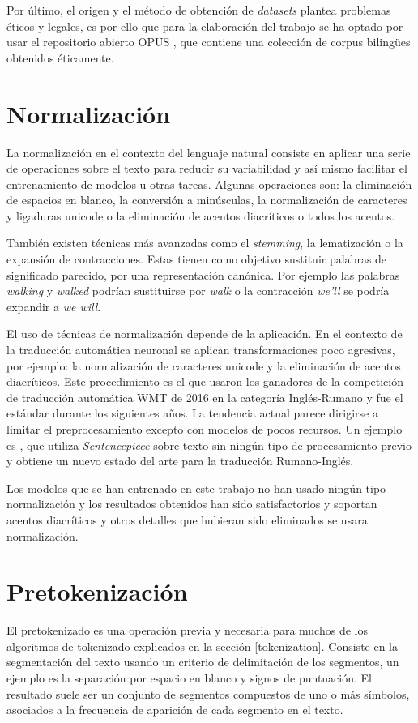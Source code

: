Por último, el origen y el método de obtención de \textit{datasets} plantea problemas éticos y legales, es por ello que para la elaboración del trabajo se ha optado por usar el repositorio abierto OPUS \cite{CORPUS}, que contiene una colección de corpus biling{\"u}es obtenidos éticamente.

\section{Normalización}\label{datanorm}
La normalización en el contexto del lenguaje natural consiste en aplicar una serie de operaciones sobre el texto para reducir su variabilidad y así mismo facilitar el entrenamiento de modelos u otras tareas. Algunas operaciones son: la eliminación de espacios en blanco, la conversión a minúsculas, la normalización de caracteres y ligaduras unicode o la eliminación de acentos diacríticos o todos los acentos.

También existen técnicas más avanzadas como el \textit{stemming}, la lematización o la expansión de contracciones. Estas tienen como objetivo sustituir palabras de significado parecido, por una representación canónica. Por ejemplo las palabras \textit{walking} y \textit{walked} podrían sustituirse por \textit{walk} o la contracción \textit{we'll} se podría expandir a \textit{we will}.

El uso de técnicas de normalización depende de la aplicación. En el contexto de la traducción automática neuronal se aplican transformaciones poco agresivas, por ejemplo: la normalización de caracteres unicode y la eliminación de acentos diacríticos.
Este procedimiento es el que usaron los ganadores de la competición de traducción automática WMT de 2016 en la categoría Inglés-Rumano \cite{Sennrich2016Jun} y fue el estándar durante los siguientes años. La tendencia actual parece dirigirse a limitar el preprocesamiento excepto con modelos de pocos recursos. Un ejemplo es \cite{Liu2020Jan}, que utiliza \textit{Sentencepiece} sobre texto sin ningún tipo de procesamiento previo y obtiene un nuevo estado del arte para la traducción Rumano-Inglés.

Los modelos que se han entrenado en este trabajo no han usado ningún tipo normalización y los resultados obtenidos han sido satisfactorios y soportan acentos diacríticos y otros detalles que hubieran sido eliminados se usara normalización.

\section{Pretokenización}
El pretokenizado es una operación previa y necesaria para muchos de los algoritmos de tokenizado explicados en la sección \ref{tokenization}. Consiste en la segmentación del texto usando un criterio de delimitación de los segmentos, un ejemplo es la separación por espacio en blanco y signos de puntuación.
El resultado suele ser un conjunto de segmentos compuestos de uno o más símbolos, asociados a la frecuencia de aparición de cada segmento en el texto. 

